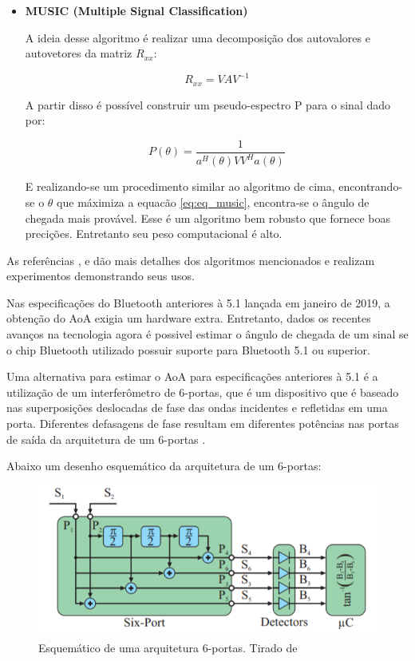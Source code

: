 \begin{itemize}
    \item \textbf{MUSIC (Multiple Signal Classification)}
    
    A ideia desse algoritmo é realizar uma decomposição dos autovalores e autovetores da matriz \( R_{xx} \):

    \begin{equation} \label{eq:eq_autovalores_rxx}
        R_{xx} = VAV^{-1}
    \end{equation}

    A partir disso é possível construir um pseudo-espectro P para o sinal dado por:

    \begin{equation} \label{eq:eq_music}
        P(\theta) = \frac{1}{a^{H}(\theta)VV^{H}a(\theta)}
    \end{equation}

    E realizando-se um procedimento similar ao algoritmo de cima, encontrando-se o \( \theta \) que máximiza a equacão \ref{eq:eq_music}, encontra-se o ângulo de chegada mais provável. Esse é um algoritmo bem robusto que fornece boas precições. Entretanto seu peso computacional é alto.


\end{itemize}

As referências \cite{art19}, \cite{techreport1} e \cite{art20} dão mais detalhes dos algoritmos mencionados e realizam experimentos demonstrando seus usos.



Nas especificações do Bluetooth anteriores à 5.1 lançada em janeiro de 2019, a obtenção do AoA exigia um hardware extra.
Entretanto, dados os recentes avanços na tecnologia agora é possivel estimar o ângulo de chegada de um sinal se o chip Bluetooth utilizado possuir suporte para Bluetooth 5.1 ou superior.

Uma alternativa para estimar o AoA para especificações anteriores à 5.1 é a utilização de um interferômetro de 6-portas, que é um dispositivo que é baseado nas superposições deslocadas de fase das ondas incidentes e refletidas em uma porta. Diferentes defasagens de fase resultam em diferentes potências nas portas de saída da arquitetura de um 6-portas \cite{art14}.

Abaixo um desenho esquemático da arquitetura de um 6-portas:

\begin{figure}[H]
	\centering
	\includegraphics[scale = 1]{images/six_port_schematic.png}
	\caption{Esquemático de uma arquitetura 6-portas. Tirado de \cite{art15} }
	\label{fig:six_port_schematic}
\end{figure}

